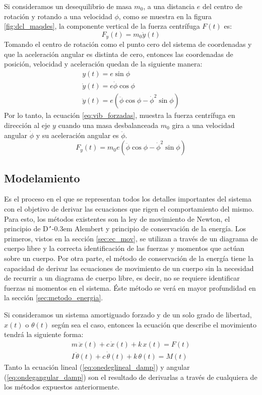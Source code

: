 Si consideramos un desequilibrio de masa $m_0$, a una distancia $e$ del centro de rotación y rotando a una velocidad $\phi$, como se muestra en la figura \ref{fig:dcl_maqdes}, la componente vertical de la fuerza centrífuga $F(t)$ es:
\begin{equation}
	F_y(t) = m_0\ddot{y}(t)
\end{equation}
Tomando el centro de rotación como el punto cero del sistema de coordenadas y que la aceleración angular es distinta de cero, entonces las coordenadas de posición, velocidad y aceleración quedan de la siguiente manera:
\begin{gather*}
	y(t) = e \sin \phi\\
	\dot{y}(t) = e \dot{\phi}\cos \phi\\
	\ddot{y}(t) = e(\ddot{\phi}\cos\phi - \dot{\phi}^2\sin\phi)
\end{gather*}
Por lo tanto, la ecuación \ref{eq:vib_forzadas}, muestra la fuerza centrífuga en dirección al eje $y$ cuando una masa desbalanceada $m_0$ gira a una velocidad angular $\dot{\phi}$ y su aceleración angular es $\ddot{\phi}$.
\begin{equation}\label{eq:vib_forzadas}
	F_y(t) = m_0e(\ddot{\phi}\cos\phi- \dot{\phi}^2\sin\phi)
\end{equation}

\subsection{Modelamiento}
Es el proceso en el que se representan todos los detalles importantes del sistema con el objetivo de derivar las ecuaciones que  rigen el comportamiento del mismo. Para esto, los métodos existentes son la ley de movimiento de Newton, el principio de D\texttt{'}\kern-0.3em Alembert y principio de conservación de la energía. Los primeros, vistos en la sección \ref{sec:ec_mov}, se utilizan a través de un diagrama de cuerpo libre y la correcta identificación de las fuerzas y momentos que actúan sobre un cuerpo. Por otra parte, el método de conservación de la energía tiene la capacidad de derivar las ecuaciones de movimiento de un cuerpo sin la necesidad de recurrir a un diagrama de cuerpo libre, es decir, no se requiere identificar fuerzas ni momentos en el sistema. Éste método se verá en mayor profundidad en la sección \ref{sec:metodo_energia}.

Si consideramos un sistema amortiguado forzado y de un solo grado de libertad, $x(t)$ o $\theta(t)$ según sea el caso, entonces la ecuación que describe el movimiento tendrá la siguiente forma:
\begin{subequations}
\begin{align}
	m\,\ddot{x}(t) + c\,\dot{x}(t) + k\,x(t) = F(t) \label{eq:onedeglineal_damp}\\
	I\,\ddot{\theta}(t) + c\,\dot{\theta}(t) + k\,\theta(t) = M(t) \label{eq:ondegangular_damp}
\end{align}
\end{subequations}
Tanto la ecuación lineal (\ref{eq:onedeglineal_damp}) y angular (\ref{eq:ondegangular_damp}) son el resultado de derivarlas a través de cualquiera de los métodos expuestos anteriormente.  
 
